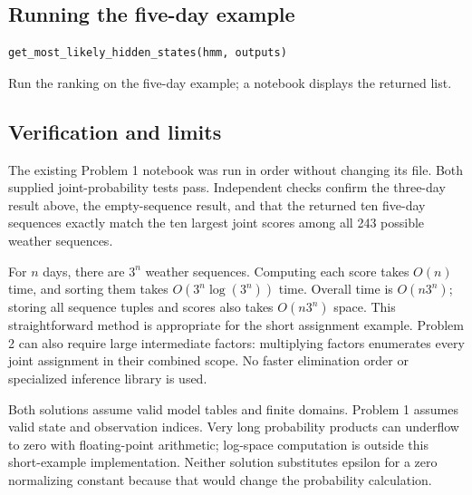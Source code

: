 \documentclass[11pt,a4paper]{article}
\begin{document}
\subsection{Running the five-day example}
\begin{lstlisting}
get_most_likely_hidden_states(hmm, outputs)
\end{lstlisting}
\begin{description}[style=nextline,leftmargin=19mm,font=\normalfont\bfseries]
\item[Line 1.] Run the ranking on the five-day example; a notebook displays the returned list.
\end{description}
\subsection{Verification and limits}
The existing Problem 1 notebook was run in order without changing its file.
Both supplied joint-probability tests pass. Independent checks confirm the
three-day result above, the empty-sequence result, and that the returned ten
five-day sequences exactly match the ten largest joint scores among all 243
possible weather sequences.

For \(n\) days, there are \(3^n\) weather sequences. Computing each score takes
\(O(n)\) time, and sorting them takes \(O(3^n\log(3^n))\) time. Overall time
is \(O(n3^n)\); storing all sequence tuples and scores also takes \(O(n3^n)\)
space. This straightforward method is appropriate for the short assignment example.
Problem 2 can also require large intermediate factors: multiplying factors
enumerates every joint assignment in their combined scope. No faster elimination
order or specialized inference library is used.

Both solutions assume valid model tables and finite domains. Problem 1 assumes
valid state and observation indices. Very long probability products can underflow
to zero with floating-point arithmetic; log-space computation is outside this
short-example implementation. Neither solution substitutes epsilon for a zero
normalizing constant because that would change the probability calculation.
\end{document}
